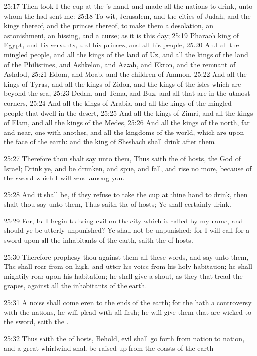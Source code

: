 25:17 Then took I the cup at the \LORD's hand, and made all the nations to drink, unto whom the \LORD had sent me: 25:18 To wit, Jerusalem, and the cities of Judah, and the kings thereof, and the princes thereof, to make them a desolation, an astonishment, an hissing, and a curse; as it is this day; 25:19 Pharaoh king of Egypt, and his servants, and his princes, and all his people; 25:20 And all the mingled people, and all the kings of the land of Uz, and all the kings of the land of the Philistines, and Ashkelon, and Azzah, and Ekron, and the remnant of Ashdod, 25:21 Edom, and Moab, and the children of Ammon, 25:22 And all the kings of Tyrus, and all the kings of Zidon, and the kings of the isles which are beyond the sea, 25:23 Dedan, and Tema, and Buz, and all that are in the utmost corners, 25:24 And all the kings of Arabia, and all the kings of the mingled people that dwell in the desert, 25:25 And all the kings of Zimri, and all the kings of Elam, and all the kings of the Medes, 25:26 And all the kings of the north, far and near, one with another, and all the kingdoms of the world, which are upon the face of the earth: and the king of Sheshach shall drink after them.

25:27 Therefore thou shalt say unto them, Thus saith the \LORD of hosts, the God of Israel; Drink ye, and be drunken, and spue, and fall, and rise no more, because of the sword which I will send among you.

25:28 And it shall be, if they refuse to take the cup at thine hand to drink, then shalt thou say unto them, Thus saith the \LORD of hosts; Ye shall certainly drink.

25:29 For, lo, I begin to bring evil on the city which is called by my name, and should ye be utterly unpunished? Ye shall not be unpunished: for I will call for a sword upon all the inhabitants of the earth, saith the \LORD of hosts.

25:30 Therefore prophesy thou against them all these words, and say unto them, The \LORD shall roar from on high, and utter his voice from his holy habitation; he shall mightily roar upon his habitation; he shall give a shout, as they that tread the grapes, against all the inhabitants of the earth.

25:31 A noise shall come even to the ends of the earth; for the \LORD hath a controversy with the nations, he will plead with all flesh; he will give them that are wicked to the sword, saith the \LORD.

25:32 Thus saith the \LORD of hosts, Behold, evil shall go forth from nation to nation, and a great whirlwind shall be raised up from the coasts of the earth.

